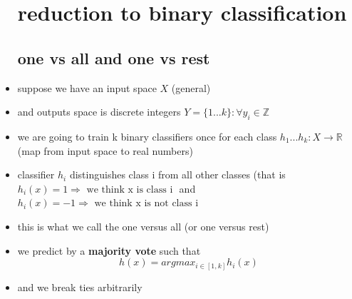 \documentclass{article}
\begin{document}
\begin{itemize}
\section{reduction to binary classification}
\subsection*{one vs all and one vs rest }
\item suppose we have an input space $X$ (general)
\item and outputs space is discrete integers $Y=\{1...k\}:\forall y_i\in \mathbb{Z}$
\item we are going to train k binary classifiers once for each class $h_1...h_k:X\rightarrow \mathbb{R}$ (map from input space to real numbers)
\item classifier $h_i$ distinguishes class i from all other classes (that is $h_i(x)=1\Rightarrow \text{ we think x is class i } $ and $h_i(x)=-1\Rightarrow \text{ we think x is not class i } $
\item this is what we call the one versus all (or one versus rest)
\item we predict by a \textbf{majority vote } such that $$h(x)=argmax_{i\in [1,k]}h_i(x)$$
\item and we break ties arbitrarily 

\end{itemize}
\end{document}
